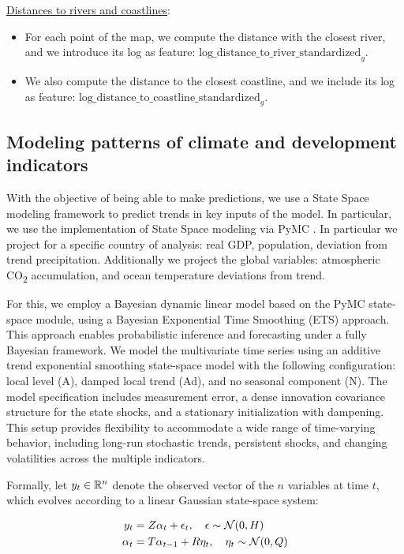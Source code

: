 \underline{Distances to rivers and coastlines}:
\begin{itemize}
    \item For each point of the map, we compute the distance with the closest river, and we introduce its log as feature: $\text{log\_distance\_to\_river\_standardized}_{g}$.
    \item We also compute the distance to the closest coastline, and we include its log as feature: $\text{log\_distance\_to\_coastline\_standardized}_{g}$.
\end{itemize}

\subsection{Modeling patterns of climate and development indicators}

With the objective of being able to make predictions, we use a State Space modeling framework to predict trends in key inputs of the model. In particular, we use the implementation of State Space modeling via PyMC \citep{pymc-extras-statespace}. In particular we project for a specific country of analysis: real GDP, population, deviation from trend precipitation. Additionally we project the global variables: atmospheric CO\textsubscript{2} accumulation, and ocean temperature deviations from trend.

For this, we employ a Bayesian dynamic linear model based on the PyMC state-space module, using a Bayesian Exponential Time Smoothing (ETS) \citep{ets_time_series} approach. This approach enables probabilistic inference and forecasting under a fully Bayesian framework. We model the multivariate time series using an additive trend exponential smoothing state-space model with the following configuration: local level (A), damped local trend (Ad), and no seasonal component (N). The model specification includes measurement error, a dense innovation covariance structure for the state shocks, and a stationary initialization with dampening. This setup provides flexibility to accommodate a wide range of time-varying behavior, including long-run stochastic trends, persistent shocks, and changing volatilities across the multiple indicators.

Formally, let $y_t \in \mathbb{R}^n$ denote the observed vector of the $n$ variables at time $t$, which evolves according to a linear Gaussian state-space system:

\begin{align}
y_t &= Z\alpha_t + \epsilon_t, \quad \epsilon \sim \mathcal{N}(0, H) \\
\alpha_t &= T\alpha_{t-1} + R\eta_t, \quad \eta_t \sim \mathcal{N}(0, Q)
\end{align}

